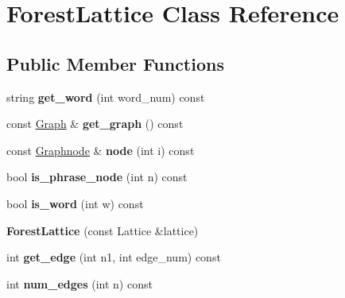 \hypertarget{classForestLattice}{
\section{ForestLattice Class Reference}
\label{classForestLattice}
}
\subsection*{Public Member Functions}
\begin{DoxyCompactItemize}
\item 
\hypertarget{classForestLattice_ad14bc799ac36b716c292f410e1609462}{
string {\bfseries get\_\-word} (int word\_\-num) const }
\label{classForestLattice_ad14bc799ac36b716c292f410e1609462}

\item 
\hypertarget{classForestLattice_a8303ce943210d4a62132f1e4054b7191}{
const \hyperlink{classScarab_1_1Graph_1_1Graph}{Graph} \& {\bfseries get\_\-graph} () const }
\label{classForestLattice_a8303ce943210d4a62132f1e4054b7191}

\item 
\hypertarget{classForestLattice_a744558d8489b4428c44275f0966d587e}{
const \hyperlink{classScarab_1_1Graph_1_1Graphnode}{Graphnode} \& {\bfseries node} (int i) const }
\label{classForestLattice_a744558d8489b4428c44275f0966d587e}

\item 
\hypertarget{classForestLattice_a8afba92a7fb437a93db30b2336ad3824}{
bool {\bfseries is\_\-phrase\_\-node} (int n) const }
\label{classForestLattice_a8afba92a7fb437a93db30b2336ad3824}

\item 
\hypertarget{classForestLattice_a9d82493dff97186334923b582999f63c}{
bool {\bfseries is\_\-word} (int w) const }
\label{classForestLattice_a9d82493dff97186334923b582999f63c}

\item 
\hypertarget{classForestLattice_a9ecaabd3e59148b28b3fad096806f9e9}{
{\bfseries ForestLattice} (const Lattice \&lattice)}
\label{classForestLattice_a9ecaabd3e59148b28b3fad096806f9e9}

\item 
\hypertarget{classForestLattice_a981af70e7207ece0e3454251b64fb6fa}{
int {\bfseries get\_\-edge} (int n1, int edge\_\-num) const }
\label{classForestLattice_a981af70e7207ece0e3454251b64fb6fa}

\item 
\hypertarget{classForestLattice_a142184cf6e8d4275923774edbca97f5d}{
int {\bfseries num\_\-edges} (int n) const }
\label{classForestLattice_a142184cf6e8d4275923774edbca97f5d}


\end{DoxyCompactItemize}
